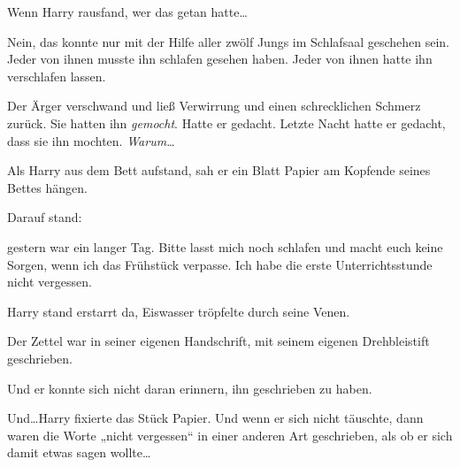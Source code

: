 Wenn Harry rausfand, wer das getan hatte…

Nein, das konnte nur mit der Hilfe aller zwölf Jungs im Schlafsaal geschehen sein. Jeder von ihnen musste ihn schlafen gesehen haben. Jeder von ihnen hatte ihn verschlafen lassen.

Der Ärger verschwand und ließ Verwirrung und einen schrecklichen Schmerz zurück. Sie hatten ihn \emph{gemocht}. Hatte er gedacht. Letzte Nacht hatte er gedacht, dass sie ihn mochten. \emph{Warum…}

Als Harry aus dem Bett aufstand, sah er ein Blatt Papier am Kopfende seines Bettes hängen.

Darauf stand:


\begin{writtenNote}

gestern war ein langer Tag. Bitte lasst mich noch schlafen und macht euch keine Sorgen, wenn ich das Frühstück verpasse. Ich habe die erste Unterrichtsstunde nicht vergessen.

\end{writtenNote}

Harry stand erstarrt da, Eiswasser tröpfelte durch seine Venen.

Der Zettel war in seiner eigenen Handschrift, mit seinem eigenen Drehbleistift geschrieben.

Und er konnte sich nicht daran erinnern, ihn geschrieben zu haben.

Und…Harry fixierte das Stück Papier. Und wenn er sich nicht täuschte, dann waren die Worte „nicht vergessen“ in einer anderen Art geschrieben, als ob er sich damit etwas sagen wollte…

